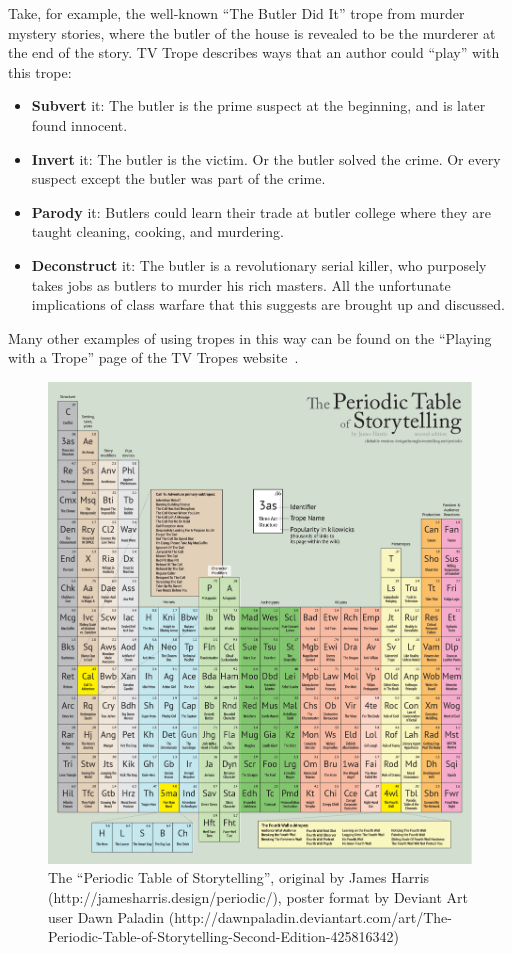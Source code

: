 \documentclass[11pt]{report}
\begin{document}
Take, for example, the well-known ``The Butler Did It'' trope from murder
mystery stories, where the butler of the house is revealed to be the murderer at
the end of the story. TV Trope describes ways that an author could ``play'' with this trope:

\begin{itemize}
  \item \textbf{Subvert} it: The butler is the prime suspect at the beginning, and is later found innocent.
  \item \textbf{Invert} it: The butler is the victim. Or the butler solved the crime. Or every suspect except the butler was part of the crime.
  \item \textbf{Parody} it: Butlers could learn their trade at butler college where they are taught cleaning, cooking, and murdering.
  \item \textbf{Deconstruct} it: The butler is a revolutionary serial killer, who purposely takes jobs as butlers to murder his rich masters. All the unfortunate implications of class warfare that this suggests are brought up and discussed.
\end{itemize}

Many other examples of using tropes in this way can be found on the ``Playing
with a Trope'' page of the TV Tropes website~\citep{playing-tropes}.

\begin{figure}[p!]
\centerline{\includegraphics[height=0.9\textheight]{periodicTable.png}}
\caption{The ``Periodic Table of Storytelling'', original by James Harris
  (http://jamesharris.design/periodic/), poster format by Deviant Art user Dawn
  Paladin (http://dawnpaladin.deviantart.com/art/The-Periodic-Table-of-Storytelling-Second-Edition-425816342)} \label{fig:periodic-table}
\end{figure}
\end{document}
